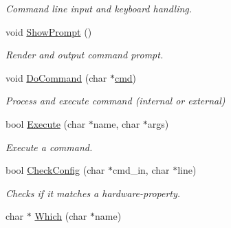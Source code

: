 \begin{DoxyCompactItemize}
\begin{DoxyCompactList}\small\item\em Command line input and keyboard handling. \end{DoxyCompactList}\item 
\hypertarget{classDOS__Shell_af64acad6a303bf9e0343dc5affb0642b}{void \hyperlink{classDOS__Shell_af64acad6a303bf9e0343dc5affb0642b}{Show\-Prompt} ()}\label{classDOS__Shell_af64acad6a303bf9e0343dc5affb0642b}

\begin{DoxyCompactList}\small\item\em Render and output command prompt. \end{DoxyCompactList}\item 
\hypertarget{classDOS__Shell_a35c1864ac6ee344e53e76dc2811653bc}{void \hyperlink{classDOS__Shell_a35c1864ac6ee344e53e76dc2811653bc}{Do\-Command} (char $\ast$\hyperlink{classProgram_af637f18e9637b148fbecbd3f0bc748fc}{cmd})}\label{classDOS__Shell_a35c1864ac6ee344e53e76dc2811653bc}

\begin{DoxyCompactList}\small\item\em Process and execute command (internal or external) \end{DoxyCompactList}\item 
\hypertarget{classDOS__Shell_afd2875b08f791d9100ef111800855f09}{bool \hyperlink{classDOS__Shell_afd2875b08f791d9100ef111800855f09}{Execute} (char $\ast$name, char $\ast$args)}\label{classDOS__Shell_afd2875b08f791d9100ef111800855f09}

\begin{DoxyCompactList}\small\item\em Execute a command. \end{DoxyCompactList}\item 
\hypertarget{classDOS__Shell_a76295a24e50b9f37bff152be05c8ea93}{bool \hyperlink{classDOS__Shell_a76295a24e50b9f37bff152be05c8ea93}{Check\-Config} (char $\ast$cmd\-\_\-in, char $\ast$line)}\label{classDOS__Shell_a76295a24e50b9f37bff152be05c8ea93}

\begin{DoxyCompactList}\small\item\em Checks if it matches a hardware-\/property. \end{DoxyCompactList}\item 
\hypertarget{classDOS__Shell_af11150e3f79f620378398abad5117222}{char $\ast$ \hyperlink{classDOS__Shell_af11150e3f79f620378398abad5117222}{Which} (char $\ast$name)}\label{classDOS__Shell_af11150e3f79f620378398abad5117222}


\end{DoxyCompactItemize}
